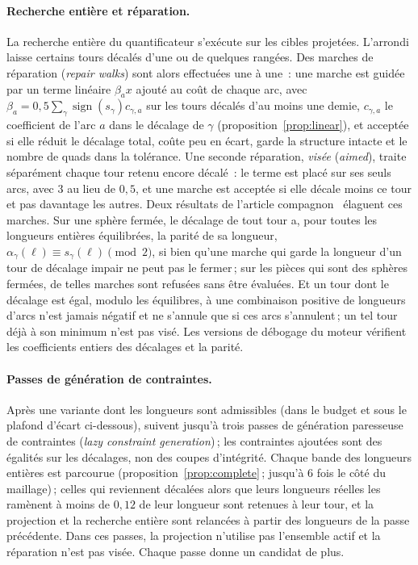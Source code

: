 \documentclass[11pt,a4paper]{article}
\newcommand{\shift}{s}
\begin{document}
\paragraph{Recherche entière et réparation.}
La recherche entière du quantificateur s'exécute sur les cibles projetées.
L'arrondi laisse certains tours décalés d'une ou de quelques rangées. Des
marches de réparation (\emph{repair walks}) sont alors effectuées une à
une~: une marche est guidée par un terme linéaire $\beta_a x$ ajouté au coût
de chaque arc, avec $\beta_a = 0,5 \sum_\gamma \operatorname{sign}(\shift_\gamma)
c_{\gamma, a}$ sur les tours décalés d'au moins une demie, $c_{\gamma, a}$ le
coefficient de l'arc $a$ dans le décalage de $\gamma$
(proposition~\ref{prop:linear}), et acceptée si elle réduit le décalage total, coûte peu en écart, garde la
structure intacte et le nombre de quads dans la tolérance. Une seconde
réparation, \emph{visée} (\emph{aimed}), traite séparément chaque tour retenu
encore décalé~: le terme est placé sur ses seuls arcs, avec $3$ au lieu de
$0,5$, et une marche est
acceptée si elle décale moins ce tour et pas davantage les autres. Deux
résultats de l'article compagnon~\cite{gardent2026turns} élaguent ces
marches. Sur une sphère fermée, le décalage de tout tour a, pour toutes les
longueurs entières équilibrées, la parité de sa longueur, $\alpha_\gamma(\ell)
\equiv \shift_\gamma(\ell) \pmod 2$, si bien qu'une marche qui garde la
longueur d'un tour de décalage impair ne peut pas le fermer\,; sur les pièces
qui sont des sphères fermées, de telles marches sont refusées sans être
évaluées. Et un tour dont le décalage est égal, modulo les équilibres, à une
combinaison positive de longueurs d'arcs n'est jamais négatif et ne
s'annule que si ces arcs s'annulent\,; un tel tour déjà à son minimum n'est
pas visé. Les versions de débogage du moteur vérifient les coefficients
entiers des décalages et la parité.

\paragraph{Passes de génération de contraintes.}
Après une variante dont les longueurs sont admissibles (dans le budget et
sous le plafond d'écart ci-dessous), suivent jusqu'à trois passes de
génération paresseuse de contraintes (\emph{lazy constraint generation})\,;
les contraintes ajoutées sont des égalités sur les décalages, non des coupes
d'intégrité. Chaque bande des longueurs entières est parcourue
(proposition~\ref{prop:complete}\,; jusqu'à $6$ fois le côté du maillage)\,;
celles qui reviennent décalées alors que leurs longueurs réelles les
ramènent à moins de $0,12$ de leur longueur sont retenues à leur tour, et la
projection et la recherche entière sont relancées à partir des longueurs de
la passe précédente. Dans ces passes, la projection n'utilise pas
l'ensemble actif et la réparation n'est pas visée. Chaque passe donne un
candidat de plus.
\end{document}
